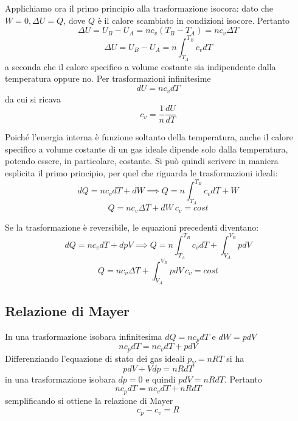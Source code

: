 \documentclass[class=book, crop=false, oneside, 12pt]{standalone}
\begin{document}
Applichiamo ora il primo principio alla trasformazione isocora: dato che \(W = 0, \Delta U = Q\), dove \(Q\) è il calore scambiato in condizioni isocore. 
Pertanto 
\begin{equation}
    \Delta U = U_B - U_A = n c_v (T_B - T_A) = n c_v \Delta T 
\end{equation}
\begin{equation}
    \Delta U = U_B - U_A = n \int_{T_A}^{T_B} c_v d T
\end{equation}
a seconda che il calore specifico a volume costante sia indipendente dalla temperatura oppure no. 
Per trasformazioni infinitesime
\begin{equation}
    d U = n c_v d T
\end{equation}
da cui si ricava
\begin{equation}
    c_v = \frac{1}{n} \frac{d U}{d T}
\end{equation}

Poiché l'energia interna è funzione soltanto della temperatura, anche il calore specifico a volume costante di un gas ideale dipende solo dalla temperatura, potendo essere, in particolare, costante.
Si può quindi scrivere in maniera esplicita il primo principio, per quel che riguarda le trasformazioni ideali:
\begin{equation} \label{primo_principio_trasf_ideali}
    d Q = n c_v d T + d W \implies Q = n \int_{T_A}^{T_B} c_v d T + W
\end{equation}
\begin{equation}
    Q = n c_v \Delta T + d W \ c_v = cost
\end{equation}

Se la trasformazione è reversibile, le equazioni precedenti diventano:
\begin{equation}
    d Q = n c_v d T + d p V \implies Q = n \int_{T_A}^{T_B} c_v d T + \int_{V_A}^{V_B} p d V
\end{equation}
\begin{equation}
    Q = n c_v \Delta T + \int_{V_A}^{V_B} p d V \ c_v = cost
\end{equation}

\subsection{Relazione di Mayer}

In una trasformazione isobara infinitesima \(d Q = n c_p d T\) e \(d W = p d V\)
\begin{equation*}
    n c_p d T = n c_v d T + p d V
\end{equation*}
Differenziando l'equazione di stato dei gas ideali \(p_V = n R T\) si ha
\begin{equation*}
    p d V + V d p = n R d T
\end{equation*}
in una trasformazione isobara \(d p = 0\) e quindi \(p d V = n R d T\). Pertanto
\begin{equation*}
    n c_p d T = n c_v d T + n R d T
\end{equation*}
semplificando si ottiene la relazione di Mayer
\begin{equation}
    c_p - c_v = R
\end{equation}
\end{document}
